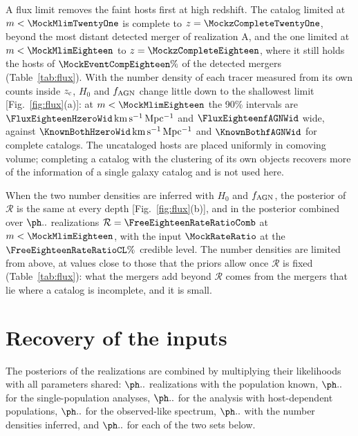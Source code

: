 \documentclass[aps,prd,reprint,superscriptaddress,nofootinbib,nolongbibliography,floatfix]{revtex4-2}
\newcommand{\kms}{\,\mathrm{km\,s^{-1}\,Mpc^{-1}}}
\newcommand{\fagn}{f_{\rm AGN}}
\newcommand{\RR}{\mathcal{R}}
\begin{document}
A flux limit removes the faint hosts first at high redshift.
The catalog limited at $m<\MockMlimTwentyOne$ is complete to $z=\MockzCompleteTwentyOne$, beyond the most distant detected merger of realization A, and the one limited at $m<\MockMlimEighteen$ to $z=\MockzCompleteEighteen$, where it still holds the hosts of $\MockEventCompEighteen\%$ of the detected mergers (Table~\ref{tab:flux}).
With the number density of each tracer measured from its own counts inside $z_{\rm c}$, $H_0$ and $\fagn$ change little down to the shallowest limit [Fig.~\ref{fig:flux}(a)]: at $m<\MockMlimEighteen$ the 90\% intervals are $\FluxEighteenHzeroWid\kms$ and $\FluxEighteenfAGNWid$ wide, against $\KnownBothHzeroWid\kms$ and $\KnownBothfAGNWid$ for complete catalogs. %
The uncataloged hosts are placed uniformly in comoving volume; completing a catalog with the clustering of its own objects recovers more of the information of a single galaxy catalog \cite{Dalang:2023ehp,Leyde:2025rzk,Barbieri:2026fdy,Borghi:2025pav} and is not used here.

When the two number densities are inferred with $H_0$ and $\fagn$, the posterior of $\RR$ is the same at every depth [Fig.~\ref{fig:flux}(b)], and in the posterior combined over $\NrealFree$ realizations $\RR=\FreeEighteenRateRatioComb$ at $m<\MockMlimEighteen$, with the input $\MockRateRatio$ at the $\FreeEighteenRateRatioCL\%$ credible level. %
The number densities are limited from above, at values close to those that the priors allow once $\RR$ is fixed (Table~\ref{tab:flux}): what the mergers add beyond $\RR$ comes from the mergers that lie where a catalog is incomplete, and it is small. %

\section{Recovery of the inputs}
\label{app:recovery}

The posteriors of the realizations are combined by multiplying their likelihoods with all parameters shared: $\NrealKnown$ realizations with the population known, $\NrealSingle$ for the single-population analyses, $\NrealHD$ for the analysis with host-dependent populations, $\NrealObs$ for the observed-like spectrum, $\NrealFree$ with the number densities inferred, and $\NrealCtrl$ for each of the two sets below.
\end{document}
